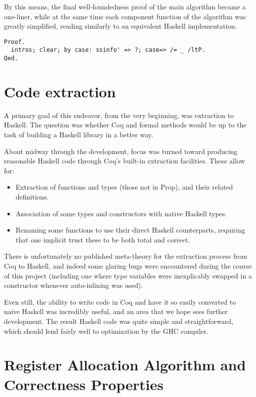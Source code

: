 \documentclass{llncs}
\begin{document}
By this means, the final well-foundedness proof of the main algorithm became a
one-liner, while at the same time each component function of the algorithm was
greatly simplified, reading similarly to an equivalent Haskell implementation.

\begin{verbatim}
Proof.
  intros; clear; by case: ssinfo' => ?; case=> /= _ /ltP.
Qed.
\end{verbatim}

\section{Code extraction}
\label{sec:extract}

A primary goal of this endeavor, from the very beginning, was extraction to
Haskell.  The question was whether Coq and formal methods would be up to the
task of building a Haskell library in a better way.

About midway through the development, focus was turned toward producing
reasonable Haskell code through Coq's built-in extraction facilities.  These
allow for:

\begin{itemize}
\item Extraction of functions and types (those not in Prop), and their related
  definitions.

\item Association of some types and constructors with native Haskell types.

\item Renaming some functions to use their direct Haskell counterparts,
  requiring that one implicit trust these to be both total and correct.
\end{itemize}

There is unfortunately no published meta-theory for the extraction process
from Coq to Haskell, and indeed some glaring bugs were encountered during the
course of this project (including one where type variables were inexplicably
swapped in a constructor whenever auto-inlining was used).

Even still, the ability to write code in Coq and have it so easily converted
to naive Haskell was incredibly useful, and an area that we hope sees further
development.  The result Haskell code was quite simple and straightforward,
which should lend fairly well to optimization by the GHC compiler.

\section{Register Allocation Algorithm and Correctness Properties}
\label{sec:alg}
\end{document}
